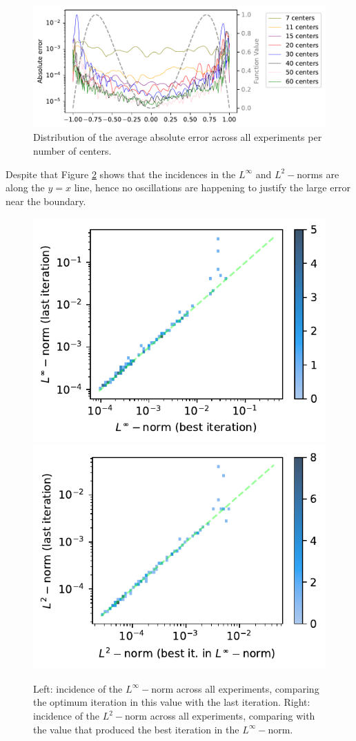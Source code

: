 \documentclass[12pt]{report} %
\begin{document}
\begin{figure}
  \includegraphics[width=\textwidth]{imagenes/experiments/1d/statistical_1d_full_scheduler_interpolation/sin_pi_x_sq/sin_pi_x_sq_avg_error.pdf}
  \caption{Distribution of the average absolute error across all experiments per number of centers.}
  \label{fig:distribution-avg-absolute-error-sin-pi-x-sq}
\end{figure}

Despite that Figure \ref{fig:incidence-l-sin-pi-x-sq-function} shows that the incidences in the $L^\infty$ and $L^2-$norms are along the $y=x$ line, hence no oscillations are happening to justify the large error near the boundary.

\begin{figure}
  \includegraphics[width=.45\textwidth]{imagenes/experiments/1d/statistical_1d_full_scheduler_interpolation/sin_pi_x_sq/incidence_of_linf_sin_pi_x_sq.pdf}
  \includegraphics[width=.45\textwidth]{imagenes/experiments/1d/statistical_1d_full_scheduler_interpolation/sin_pi_x_sq/incidence_of_l2_sin_pi_x_sq.pdf}
  \caption{Left: incidence of the $L^\infty-$norm across all experiments, comparing the optimum iteration in this value with the last iteration. Right: incidence of the $L^2-$norm across all experiments, comparing with the value that produced the best iteration in the $L^\infty-$norm.}
  \label{fig:incidence-l-sin-pi-x-sq-function}
\end{figure}
\end{document}
